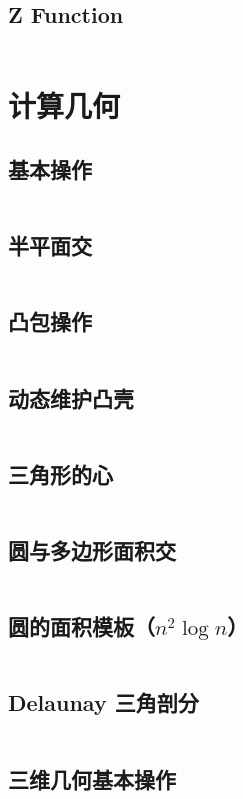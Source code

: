 \documentclass[a4paper,9]{article}
\begin{document}
\subsection{Z Function}
\inputminted[breaklines]{c++}{source/string/z-func.cpp}

\section{计算几何}
\subsection{基本操作}
\inputminted[breaklines]{c++}{source/geometry/basic.cpp}
\subsection{半平面交}
\inputminted[breaklines]{c++}{source/geometry/half-plane-intersection.cpp}
\subsection{凸包操作}
\inputminted[breaklines]{c++}{source/geometry/convex.cpp}
\subsection{动态维护凸壳}
\inputminted[breaklines]{c++}{source/geometry/dynamic-convex.cpp}
\subsection{三角形的心}
\inputminted[breaklines]{c++}{source/geometry/triangle.cpp}
\subsection{圆与多边形面积交}
\inputminted[breaklines]{c++}{source/geometry/areaCT.cpp}
\subsection{圆的面积模板（$n^2 \log n$）}
\inputminted[breaklines]{c++}{source/geometry/circle-area.cpp}
\subsection{Delaunay 三角剖分}
\inputminted[breaklines,breakanywhere]{c++}{source/geometry/delaunay.cpp}
\subsection{三维几何基本操作}
\inputminted[breaklines]{c++}{source/geometry/3d.cpp}
\end{document}
